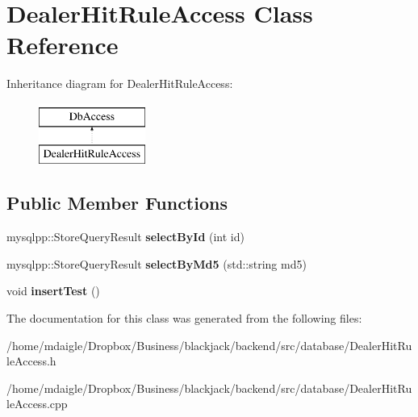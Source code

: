 \hypertarget{classDealerHitRuleAccess}{
\section{\-Dealer\-Hit\-Rule\-Access \-Class \-Reference}
\label{dc/dd5/classDealerHitRuleAccess}
}
\-Inheritance diagram for \-Dealer\-Hit\-Rule\-Access\-:\begin{figure}[H]
\begin{center}
\leavevmode
\includegraphics[height=2.000000cm]{dc/dd5/classDealerHitRuleAccess}
\end{center}
\end{figure}
\subsection*{\-Public \-Member \-Functions}
\begin{DoxyCompactItemize}
\item 
\hypertarget{classDealerHitRuleAccess_a976c67a9a98d475a325c8662591bf55d}{
mysqlpp\-::\-Store\-Query\-Result {\bfseries select\-By\-Id} (int id)}
\label{dc/dd5/classDealerHitRuleAccess_a976c67a9a98d475a325c8662591bf55d}

\item 
\hypertarget{classDealerHitRuleAccess_a9af401eb5ec4373275fc22bb60db9374}{
mysqlpp\-::\-Store\-Query\-Result {\bfseries select\-By\-Md5} (std\-::string md5)}
\label{dc/dd5/classDealerHitRuleAccess_a9af401eb5ec4373275fc22bb60db9374}

\item 
\hypertarget{classDealerHitRuleAccess_ad2983b641da02684460240a9fdd050f1}{
void {\bfseries insert\-Test} ()}
\label{dc/dd5/classDealerHitRuleAccess_ad2983b641da02684460240a9fdd050f1}

\end{DoxyCompactItemize}


\-The documentation for this class was generated from the following files\-:\begin{DoxyCompactItemize}
\item 
/home/mdaigle/\-Dropbox/\-Business/blackjack/backend/src/database/\-Dealer\-Hit\-Rule\-Access.\-h\item 
/home/mdaigle/\-Dropbox/\-Business/blackjack/backend/src/database/\-Dealer\-Hit\-Rule\-Access.\-cpp\end{DoxyCompactItemize}
